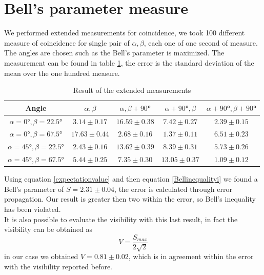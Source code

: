 \documentclass[a4paper,10pt]{article}
\begin{document}
\section{Bell's parameter measure}
We performed extended measurements for coincidence, we took 100 different measure of coincidence for single pair of $\alpha,\beta$, each one of one second of measure. The angles are chosen such as the Bell's parameter is maximized. The measurement can be found in table \ref{tab:extendedmeasures}, the error is the standard deviation of the mean over the one hundred measure.
\begin{table}[H]
\centering
\begin{tabular}{c|c|c|c|c}
Angle  & $\alpha,\beta$& $\alpha,\beta+90$°&$\alpha+90$°$,\beta$& $\alpha+90$°$,\beta+90$° \\
\hline
$\alpha=0$°$,\beta=22.5$° & $3.14\pm0.17$ & $16.59\pm0.38$ & $7.42\pm0.27$ &$2.39\pm0.15$\\
$\alpha=0$°$,\beta=67.5$° & $17.63\pm0.44$ & $2.68\pm0.16$ & $1.37\pm0.11$ &$6.51\pm0.23$\\
$\alpha=45$°$,\beta=22.5$° & $2.43\pm0.16$ & $13.62\pm0.39$ & $8.39\pm0.31$ & $5.73\pm0.26$\\
$\alpha=45$°$,\beta=67.5$° & $5.44\pm0.25$ & $7.35\pm 0.30$ & $13.05\pm0.37$ & $1.09\pm0.12$\\
\end{tabular}
\caption{\label{tab:extendedmeasures}Result of the extended measurements}
\end{table}
Using equation \eqref{expectationvalue} and then equation \eqref{Bellinequalityi} we found a Bell's parameter of $S = 2.31\pm 0.04$, the error is calculated through error propagation. Our result is greater then two within the error, so Bell's inequality has been violated. \\
It is also possible to evaluate the visibility with this last result, in fact the visibility can be obtained as
\[V = \frac{S_{max}}{2\sqrt{2}}\]
in our case we obtained $V = 0.81 \pm 0.02$, which is in agreement within the error with the visibility reported before.
\end{document}

